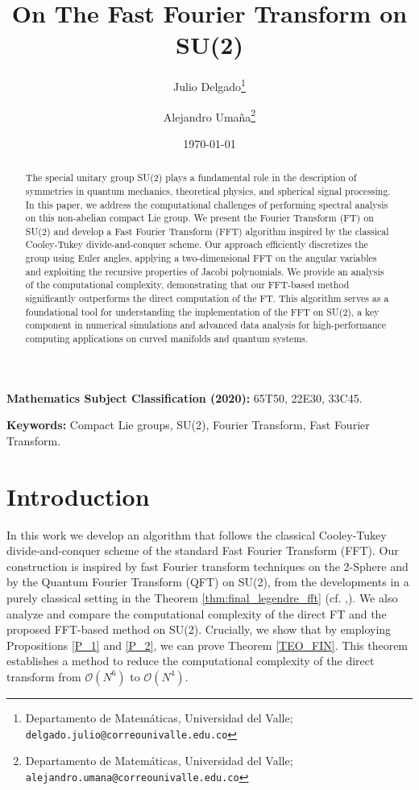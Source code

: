 \documentclass[11pt]{article}
\theoremstyle{definition}
\theoremstyle{remark}
\numberwithin{equation}{section}
\begin{document}
\title{On The Fast Fourier Transform on SU(2)}

\author{Julio Delgado\thanks{Departamento de Matem\'aticas, Universidad del Valle; \texttt{delgado.julio@correounivalle.edu.co}} \and Alejandro Uma\~na\thanks{Departamento de Matem\'aticas, Universidad del Valle; \texttt{alejandro.umana@correounivalle.edu.co}}}

\date{\today}
%
\maketitle
%
\begin{abstract}
The special unitary group SU(2) plays a fundamental role in the description of symmetries in quantum mechanics, theoretical physics, and spherical signal processing. In this paper, we address the computational challenges of performing spectral analysis on this non-abelian compact Lie group. We present the Fourier Transform (FT) on SU(2) and develop a Fast Fourier Transform (FFT) algorithm inspired by the classical Cooley-Tukey divide-and-conquer scheme. Our approach efficiently discretizes the group using Euler angles, applying a two-dimensional FFT on the angular variables and exploiting the recursive properties of Jacobi polynomials. We provide an analysis of the computational complexity, demonstrating that our FFT-based method significantly outperforms the direct computation of the FT. This algorithm serves as a foundational tool for understanding the implementation of the FFT on SU(2), a key component in numerical simulations and advanced data analysis for high-performance computing applications on curved manifolds and quantum systems.
\end{abstract}
%
\noindent\textbf{Mathematics Subject Classification (2020):} 65T50, 22E30, 33C45.

\medskip
\noindent\textbf{Keywords:} Compact Lie groups, SU(2), Fourier Transform, Fast Fourier Transform.

\bigskip
\section{Introduction}

In this work we develop an algorithm that follows the classical Cooley-Tukey divide-and-conquer scheme of the standard Fast Fourier Transform (FFT). Our construction is inspired by fast Fourier transform techniques on the 2-Sphere  and by the Quantum Fourier Transform (QFT) on SU(2), from the developments in a purely classical setting in the Theorem \ref{thm:final_legendre_fft} (cf. \cite{2-sphere},\cite{Quantum_SU(2)}). 
We also analyze and compare the computational complexity of the direct FT and the proposed FFT-based method on SU(2). 
Crucially, we show that by employing Propositions \ref{P_1} and \ref{P_2}, we can prove Theorem \ref{TEO_FIN}. This theorem establishes a method to reduce the computational complexity of the direct transform from $\mathcal{O}(N^6)$ to $\mathcal{O}(N^4)$.\\
\end{document}
